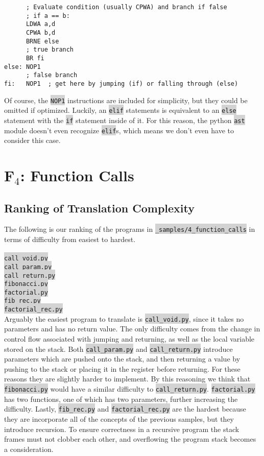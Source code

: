 \documentclass[12pt]{article}
\newcommand{\code}[1]{\colorbox{LightGray}{\texttt{#1}}}
\begin{document}
\begin{verbatim}
      ; Evaluate condition (usually CPWA) and branch if false
      ; if a == b:
      LDWA a,d
      CPWA b,d
      BRNE else
      ; true branch
      BR fi
else: NOP1
      ; false branch
fi:   NOP1  ; get here by jumping (if) or falling through (else)
\end{verbatim}
Of course, the \code{NOP1} instructions are included for simplicity, but they could be omitted if optimized. Luckily, an \code{elif} statements is equivalent to an \code{else} statement with the \code{if} statement inside of it. For this reason, the python \code{ast} module doesn't even recognize \code{elif}s, which means we don't even have to consider this case.

\section*{F$_4$: Function Calls}
\subsection*{Ranking of Translation Complexity}
The following is our ranking of the programs in \code{\_samples/4\_function\_calls} in terms of difficulty from easiest to hardest.
\\\\
\code{call\_void.py}\\
\code{call\_param.py}\\
\code{call\_return.py}\\
\code{fibonacci.py}\\
\code{factorial.py}\\
\code{fib\_rec.py}\\
\code{factorial\_rec.py}\\

Arguably the easiest program to translate is \code{call\_void.py}, since it takes no parameters and has no return value. The only difficulty comes from the change in control flow associated with jumping and returning, as well as the local variable stored on the stack. Both \code{call\_param.py} and \code{call\_return.py} introduce parameters which are pushed onto the stack, and then returning a value by pushing to the stack or placing it in the register before returning. For these reasons they are slightly harder to implement. By this reasoning we think that \code{fibonacci.py} would have a similar difficulty to \code{call\_return.py}. \code{factorial.py} has two functions, one of which has two parameters, further increasing the difficulty. Lastly, \code{fib\_rec.py} and \code{factorial\_rec.py} are the hardest because they are incorporate all of the concepts of the previous samples, but they introduce recursion. To ensure correctness in a recursive program the stack frames must not clobber each other, and overflowing the program stack becomes a consideration.
\end{document}
